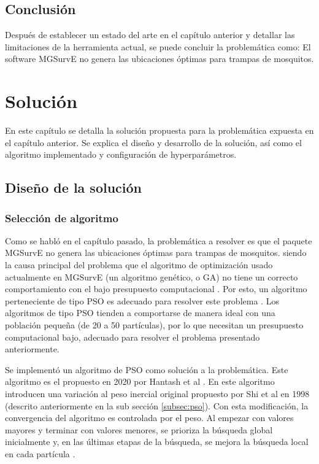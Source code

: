 \documentclass[letterpaper]{report}
\begin{document}
  \section{Conclusión}
    Después de establecer un estado del arte en el capítulo anterior y detallar
    las limitaciones de la herramienta actual, se puede concluir la problemática
    como: El software MGSurvE no genera las ubicaciones óptimas para trampas de
    mosquitos. 

\chapter{Solución}\label{chap:solucion}
  En este capítulo se detalla la solución propuesta para la problemática
  expuesta en el capítulo anterior. Se explica el diseño y desarrollo de la
  solución, así como el algoritmo implementado y configuración de
  hyperparámetros.

  \section{Diseño de la solución}
    \subsection{Selección de algoritmo}
    Como se habló en el capítulo pasado, la problemática a resolver es que el
    paquete MGSurvE no genera las ubicaciones óptimas para trampas de mosquitos.
    siendo la causa principal del
    problema que el algoritmo de optimización usado actualmente en MGSurvE
    (un algoritmo genético, o GA) no tiene un correcto comportamiento con el
    bajo presupuesto computacional \cite{SwarmVsEvol}. Por esto, un algoritmo
    perteneciente de tipo PSO es adecuado para resolver
    este problema \cite{SwarmVsEvol,PSOPopulationSize}. Los algoritmos de tipo
    PSO tienden a comportarse de manera ideal con una población pequeña (de 20
    a 50 partículas), por lo que necesitan un presupuesto computacional bajo,
    adecuado para resolver el problema presentado anteriormente.

    Se implementó un algoritmo de PSO como solución a la problemática. Este
    algoritmo es el propuesto
    en 2020 por Hantash et al \cite{PSOEnergy}. En este algoritmo introducen una
    variación al peso inercial original propuesto por Shi et al \cite{CPSO} en
    1998 (descrito anteriormente en la sub sección \ref{subsec:pso}). Con esta
    modificación, la convergencia del algoritmo es controlada por el peso. Al 
    empezar con valores mayores y terminar con valores menores, se prioriza la
    búsqueda global inicialmente y, en las últimas etapas de la búsqueda, se
    mejora la búsqueda local en cada partícula \cite{CPSO}.
\end{document}

